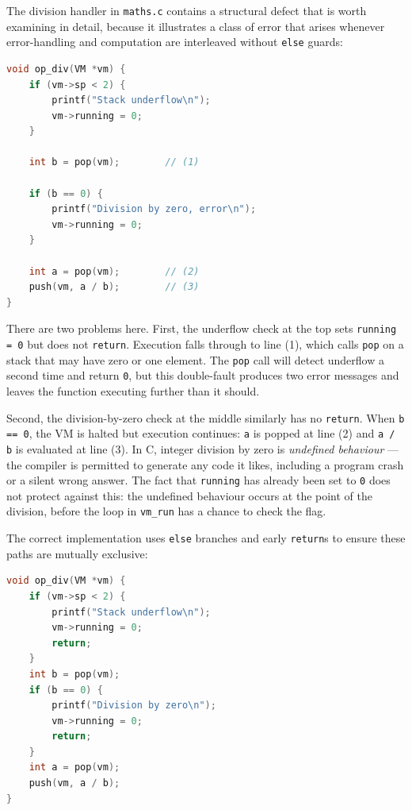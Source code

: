 The division handler in \texttt{maths.c} contains a structural defect that is worth examining in detail, because it illustrates a class of error that arises whenever error-handling and computation are interleaved without \texttt{else} guards:

\begin{lstlisting}[language=C]
void op_div(VM *vm) {
    if (vm->sp < 2) {
        printf("Stack underflow\n");
        vm->running = 0;
    }

    int b = pop(vm);        // (1)

    if (b == 0) {
        printf("Division by zero, error\n");
        vm->running = 0;
    }

    int a = pop(vm);        // (2)
    push(vm, a / b);        // (3)
}
\end{lstlisting}

There are two problems here. First, the underflow check at the top sets \texttt{running = 0} but does not \texttt{return}. Execution falls through to line (1), which calls \texttt{pop} on a stack that may have zero or one element. The \texttt{pop} call will detect underflow a second time and return \texttt{0}, but this double-fault produces two error messages and leaves the function executing further than it should.

Second, the division-by-zero check at the middle similarly has no \texttt{return}. When \texttt{b == 0}, the VM is halted but execution continues: \texttt{a} is popped at line (2) and \texttt{a / b} is evaluated at line (3). In C, integer division by zero is \textit{undefined behaviour} — the compiler is permitted to generate any code it likes, including a program crash or a silent wrong answer. The fact that \texttt{running} has already been set to \texttt{0} does not protect against this: the undefined behaviour occurs at the point of the division, before the loop in \texttt{vm\_run} has a chance to check the flag.

The correct implementation uses \texttt{else} branches and early \texttt{return}s to ensure these paths are mutually exclusive:

\begin{lstlisting}[language=C]
void op_div(VM *vm) {
    if (vm->sp < 2) {
        printf("Stack underflow\n");
        vm->running = 0;
        return;
    }
    int b = pop(vm);
    if (b == 0) {
        printf("Division by zero\n");
        vm->running = 0;
        return;
    }
    int a = pop(vm);
    push(vm, a / b);
}
\end{lstlisting}

